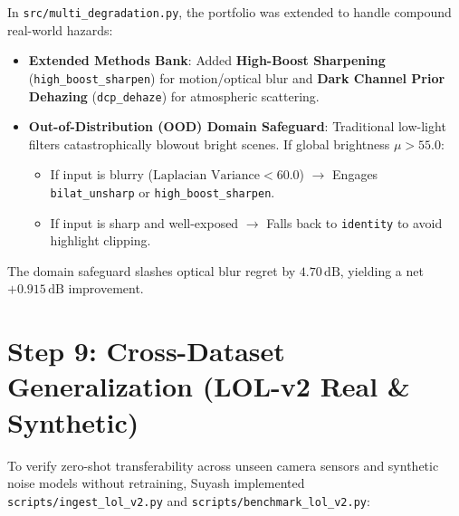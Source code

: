 \documentclass[10pt,a4paper]{article}
\begin{document}
In \texttt{src/}\allowbreak\texttt{multi\_degradation.py}, the portfolio was extended to handle compound real-world hazards:
\begin{itemize}[leftmargin=*, nosep]
    \item \textbf{Extended Methods Bank}: Added \textbf{High-Boost Sharpening} (\texttt{high\_boost\_sharpen}) for motion/optical blur and \textbf{Dark Channel Prior Dehazing} (\texttt{dcp\_dehaze}) for atmospheric scattering.
    \item \textbf{Out-of-Distribution (OOD) Domain Safeguard}: Traditional low-light filters catastrophically blowout bright scenes. If global brightness $\mu > 55.0$:
    \begin{itemize}[leftmargin=*, nosep]
        \item If input is blurry ($\text{Laplacian Variance} < 60.0$) $\to$ Engages \texttt{bilat\_unsharp} or \texttt{high\_boost\_sharpen}.
        \item If input is sharp and well-exposed $\to$ Falls back to \texttt{identity} to avoid highlight clipping.
    \end{itemize}
\end{itemize}
The domain safeguard slashes optical blur regret by \textbf{$4.70\,\text{dB}$}, yielding a net $+0.915\,\text{dB}$ improvement.

\section{Step 9: Cross-Dataset Generalization (LOL-v2 Real \& Synthetic)}

To verify zero-shot transferability across unseen camera sensors and synthetic noise models without retraining, Suyash implemented \texttt{scripts/ingest\_lol\_v2.py} and \texttt{scripts/benchmark\_lol\_v2.py}:

\begin{table}[ht!]
\centering
\small
{}
\end{table}
\end{document}
